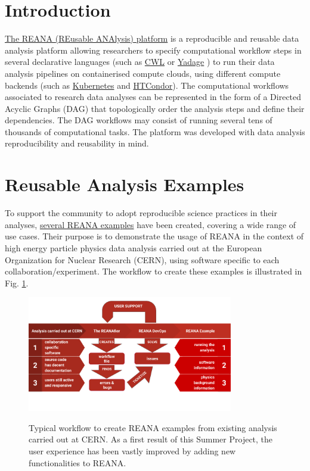 
\section{Introduction}

\href{http://www.reana.io/}{The REANA (REusable ANAlysis) platform}\cite{reana_paper} is a reproducible and reusable data analysis platform allowing researchers to specify computational workflow steps in several declarative languages (such as \href{https://www.commonwl.org/}{CWL} \cite{cwl_source} or \href{https://yadage.readthedocs.io/en/latest/}{Yadage} \cite{yadage_source}) to run their data analysis pipelines on containerised compute clouds, using different compute backends (such as \href{https://kubernetes.io/}{Kubernetes} and \href{https://research.cs.wisc.edu/htcondor/description.html}{HTCondor}). The computational workflows associated to research data analyses can be represented in the form of a Directed Acyclic Graphs (DAG) that topologically order the analysis steps and define their dependencies. The DAG workflows may consist of running several tens of thousands of computational tasks. The platform was developed with data analysis reproducibility and reusability in mind. \cite{openisnotenough_paper}


\section{Reusable Analysis Examples}

To support the community to adopt reproducible science practices in their analyses, \href{http://www.reanahub.io/#examples}{several REANA examples} have been created, covering a wide range of use cases. Their purpose is to demonstrate the usage of REANA in the context of high energy particle physics data analysis carried out at the European Organization for Nuclear Research (CERN), using software specific to each collaboration/experiment. The workflow to create these examples is illustrated in Fig. \ref{fig:workflow_creation_schema}.


\begin{figure}[H]
    \centering
    \includegraphics[width=0.8\textwidth]{figures/workflow_creation_schema.png}\\
    \caption{Typical workflow to create REANA examples from existing analysis carried out at CERN. As a first result of this Summer Project, the user experience has been vastly improved by adding new functionalities to REANA.}
    \label{fig:workflow_creation_schema}
\end{figure}


